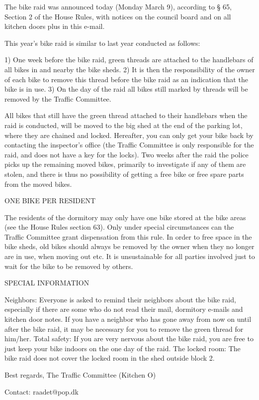 The bike raid was announced today (Monday March 9), according to § 65, Section 2 of the House Rules, with notices on the council board and on all kitchen doors plus in this e-mail.

This year’s bike raid is similar to last year conducted as follows:

1) One week before the bike raid, green threads are attached to the handlebars of all bikes in and nearby the bike sheds.
2) It is then the responsibility of the owner of each bike to remove this thread before the bike raid as an indication that the bike is in use.
3) On the day of the raid all bikes still marked by threads will be removed by the Traffic Committee.

All bikes that still have the green thread attached to their handlebars when the raid is conducted, will be moved to the big shed at the end of the parking lot, where they are chained and locked. Hereafter, you can only get your bike back by contacting the inspector's office (the Traffic Committee is only responsible for the raid, and does not have a key for the locks). Two weeks after the raid the police picks up the remaining moved bikes, primarily to investigate if any of them are stolen, and there is thus no possibility of getting a free bike or free spare parts from the moved bikes.


ONE BIKE PER RESIDENT

The residents of the dormitory may only have one bike stored at the bike areas (see the House Rules section 63). Only under special circumstances can the Traffic Committee grant dispensation from this rule. In order to free space in the bike sheds, old bikes should always be removed by the owner when they no longer are in use, when moving out etc. It is unsustainable for all parties involved just to wait for the bike to be removed by others.


SPECIAL INFORMATION

Neighbors: Everyone is asked to remind their neighbors about the bike raid, especially if there are some who do not read their mail, dormitory e-mails and kitchen door notes. If you have a neighbor who has gone away from now on until after the bike raid, it may be necessary for you to remove the green thread for him/her.
Total safety: If you are very nervous about the bike raid, you are free to just keep your bike indoors on the one day of the raid.
The locked room: The bike raid does not cover the locked room in the shed outside block 2.


Best regards,
The Traffic Committee (Kitchen O)

Contact: raadet@pop.dk
